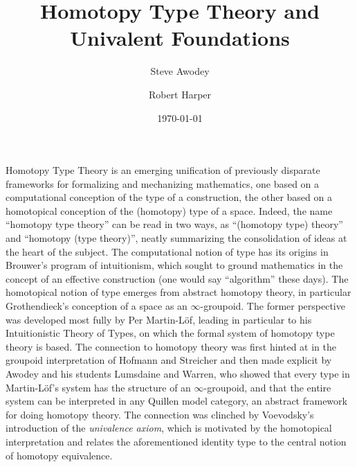 \documentclass[11pt]{article}
\theoremstyle{remark}
\theoremstyle{definition}
\begin{document}

\title{Homotopy Type Theory and Univalent Foundations}
\author{Steve Awodey \and Robert Harper}
\date{\today}

\maketitle

Homotopy Type Theory is an emerging unification of previously disparate frameworks for formalizing and mechanizing mathematics, one based on a computational conception of the type of a construction, the other based on a homotopical conception of the (homotopy) type of a space.  Indeed, the name ``homotopy type theory'' can be read in two ways, as ``(homotopy type) theory'' and ``homotopy (type theory)'', neatly summarizing the consolidation of ideas at the heart of the subject.  The computational notion of type has its origins in Brouwer's program of intuitionism, which sought to ground mathematics in the concept of an effective construction (one would say ``algorithm'' these days).  The homotopical notion of type emerges from abstract homotopy theory, in particular Grothendieck's conception of a space as an $\infty$-groupoid.  The former perspective was developed most fully by Per Martin-L\"{o}f, leading in particular to his Intuitionistic Theory of Types, on which the formal system of homotopy type theory is based.  The connection to homotopy theory was first hinted at in the groupoid interpretation of Hofmann and Streicher and then made explicit by Awodey and his students Lumsdaine and Warren, who showed that every type in Martin-L\"{o}f's system has the structure of an $\infty$-groupoid, and that the entire system can be interpreted in any Quillen model category, an abstract framework for doing homotopy theory.  The connection was clinched by Voevodsky's introduction of the \emph{univalence axiom}, which is motivated by the homotopical interpretation and relates the aforementioned identity type to the central notion of homotopy equivalence.
\end{document}
